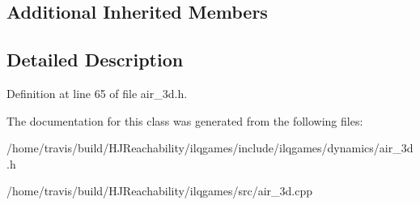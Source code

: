 \subsection*{Additional Inherited Members}


\subsection{Detailed Description}


Definition at line 65 of file air\+\_\+3d.\+h.



The documentation for this class was generated from the following files\+:\begin{DoxyCompactItemize}
\item 
/home/travis/build/\+H\+J\+Reachability/ilqgames/include/ilqgames/dynamics/air\+\_\+3d.\+h\item 
/home/travis/build/\+H\+J\+Reachability/ilqgames/src/air\+\_\+3d.\+cpp\end{DoxyCompactItemize}
